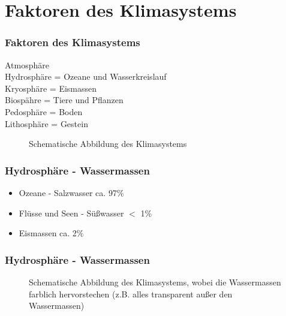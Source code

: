 \section{Faktoren des Klimasystems}


\begin{frame}
  \frametitle{Faktoren des Klimasystems}
  Atmosphäre \\
  Hydrosphäre = Ozeane und Wasserkreislauf \\
  Kryosphäre = Eismassen \\
  Biospähre = Tiere und Pflanzen \\
  Pedosphäre = Boden \\
  Lithosphäre = Gestein 
  
  \begin{figure}
  	\caption{Schematische Abbildung des Klimasystems}
  \end{figure}
\end{frame}


\begin{frame}
	\frametitle{Hydrosphäre - Wassermassen}
	\begin{itemize}
		\item Ozeane - Salzwasser ca. 97\%
		\item Flüsse und Seen - Süßwasser $<$ 1\%
		\item Eismassen ca. 2\% %
	\end{itemize}
\end{frame}

\begin{frame}
	\frametitle{Hydrosphäre - Wassermassen}
	
	\begin{figure}
		\caption{Schematische Abbildung des Klimasystems, wobei die Wassermassen farblich hervorstechen (z.B. alles transparent außer den Wassermassen)}
	\end{figure}
\end{frame}


